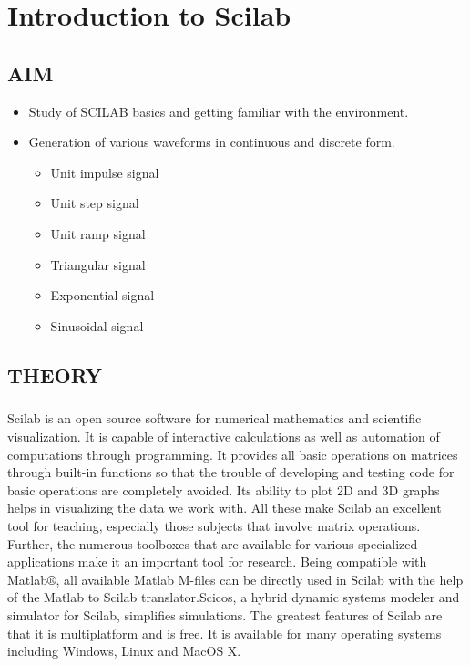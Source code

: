 \chapter [Introduction to Scilab]{Introduction to Scilab}


\section*{AIM}
\begin{itemize}
\item
Study of SCILAB basics and getting familiar with the environment.
\item
Generation of various waveforms in continuous and discrete form.
\begin{itemize}
\item
Unit impulse signal
\item
Unit step signal
\item
Unit ramp signal
\item
Triangular signal
\item

Exponential signal
\item
Sinusoidal signal
\end{itemize}
\end{itemize}

\section*{THEORY}
\paragraph{}

Scilab is an open source software for numerical mathematics and scientific visualization. It is capable of interactive calculations as well as automation of computations through programming. It provides all basic operations on matrices through built-in functions so that the trouble of developing and testing code for basic operations are completely avoided. Its ability to plot 2D and 3D graphs helps in visualizing the data we work with. All these make Scilab an excellent tool for teaching, especially those subjects that involve matrix operations. Further, the numerous toolboxes that are available for various specialized applications make it an important tool for research. Being compatible with Matlab®, all available Matlab M-files can be directly used in Scilab with the help of the Matlab to Scilab translator.Scicos, a hybrid dynamic systems modeler and simulator for Scilab, simplifies simulations. The greatest features of Scilab are that it is multiplatform and is free. It is available for many operating systems including Windows, Linux and MacOS X.

